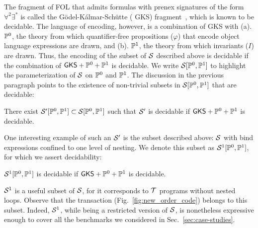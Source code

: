 The fragment of FOL that admits formulas with prenex signatures of the
form $\forall^2\exists^*$ is called the G\"odel-K\'almar-Sch\"utte ({\sf
GKS}) fragment~\cite{gks}, which is known to be decidable. The
language of encoding, however, is a combination of {\sf GKS} with (a).
$\mathbb{P}^0$, the theory from which quantifier-free propositions
($\varphi$) that encode object language expressions are drawn, and
(b). $\mathbb{P}^1$, the theory from which invariants ($I$) are drawn. Thus,
the encoding of the subset of $\mathcal{S}$ described above is decidable if the
combination of ${\sf GKS} + \mathbb{P}^0 + \mathbb{P}^1$ is decidable. We write
$\mathcal{S}[\mathbb{P}^0,\mathbb{P}^1]$ to highlight the parameterization of $\mathcal{S}$ on
$\mathbb{P}^0$ and $\mathbb{P}^1$.  The discussion in the previous paragraph
points to the existence of non-trivial subsets in $\mathcal{S}[\mathbb{P}^0,\mathbb{P}^1]$ that are
decidable:
\begin{theorem}
  There exist $\mathcal{S}'[\mathbb{P}^0,\mathbb{P}^1] \subset \mathcal{S}[\mathbb{P}^0,\mathbb{P}^1]$
  such that $\mathcal{S}'$ is decidable if ${\sf GKS}+\mathbb{P}^0+\mathbb{P}^1$ is
  decidable.
\end{theorem}
One interesting example of such an $\mathcal{S}'$ is the subset described above: $\mathcal{S}$ with
bind expressions confined to one level of nesting. We denote this
subset as $\mathcal{S}^1[\mathbb{P}^0,\mathbb{P}^1]$, for which we assert decidability:
\begin{corollary}
  $\mathcal{S}^1[\mathbb{P}^0,\mathbb{P}^1]$ is decidable if ${\sf GKS}+\mathbb{P}^0+\mathbb{P}^1$ is
  decidable.
\end{corollary}
$\mathcal{S}^1$ is a useful subset of $\mathcal{S}$, for it corresponds to $\mbox{${\mathcal T}$}$
programs without nested  loops. Observe that the
 transaction (Fig.~\ref{fig:new_order_code}) belongs to
this subset.  Indeed, $\mathcal{S}^1$, while being a restricted version of
$\mathcal{S}$, is nonetheless expressive enough to cover all the benchmarks we
considered in Sec.~\ref{sec:case-studies}.

